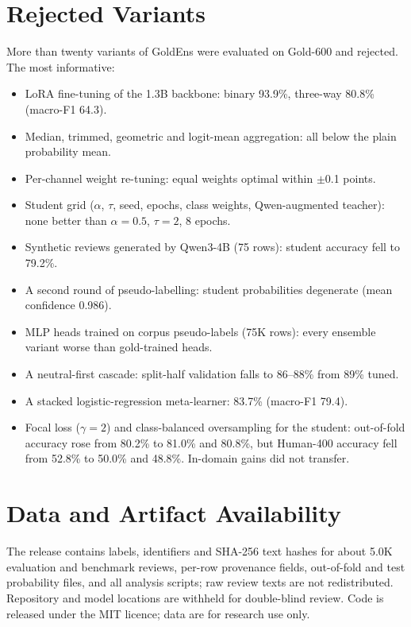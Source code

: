 \section{Rejected Variants}
\label{app:negative}

More than twenty variants of GoldEns were evaluated on Gold-600 and
rejected. The most informative:

\begin{itemize}[leftmargin=*,itemsep=1pt]
  \item LoRA fine-tuning of the 1.3B backbone: binary 93.9\%,
        three-way 80.8\% (macro-F1 64.3).
  \item Median, trimmed, geometric and logit-mean aggregation: all
        below the plain probability mean.
  \item Per-channel weight re-tuning: equal weights optimal within
        $\pm$0.1 points.
  \item Student grid ($\alpha$, $\tau$, seed, epochs, class weights,
        Qwen-augmented teacher): none better than $\alpha{=}0.5$,
        $\tau{=}2$, 8 epochs.
  \item Synthetic reviews generated by Qwen3-4B (75 rows): student
        accuracy fell to 79.2\%.
  \item A second round of pseudo-labelling: student probabilities
        degenerate (mean confidence 0.986).
  \item MLP heads trained on corpus pseudo-labels (75K rows): every
        ensemble variant worse than gold-trained heads.
  \item A neutral-first cascade: split-half validation falls to
        86--88\% from 89\% tuned.
  \item A stacked logistic-regression meta-learner: 83.7\%
        (macro-F1 79.4).
  \item Focal loss ($\gamma{=}2$) and class-balanced oversampling for
        the student: out-of-fold accuracy rose from 80.2\% to 81.0\%
        and 80.8\%, but Human-400 accuracy fell from 52.8\% to 50.0\%
        and 48.8\%. In-domain gains did not transfer.
\end{itemize}

\section{Data and Artifact Availability}
\label{app:ethics}

The release contains labels, identifiers and SHA-256 text hashes for
about 5.0K evaluation and benchmark reviews, per-row provenance
fields, out-of-fold and test probability files, and all analysis
scripts; raw review texts are not redistributed. Repository and model
locations are withheld for double-blind review. Code is released
under the MIT licence; data are for research use only.
